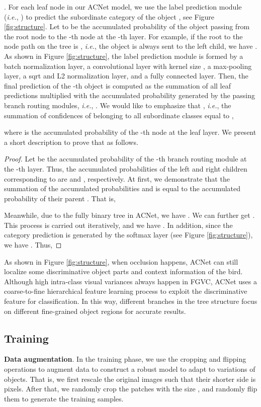 \documentclass[10pt,twocolumn,letterpaper]{article}
\def\ie{{\em i.e.}}
\begin{document}
{.} For each leaf node in our ACNet model, we use the label prediction module  (\ie, ) to predict the subordinate category of the object , see Figure \ref{fig:structure}. Let  to be the accumulated probability of the object  passing from the root node to the -th node at the -th layer. For example, if the root to the node  path on the tree is , \ie, the object  is always sent to the left child, we have . As shown in Figure \ref{fig:structure}, the label prediction module is formed by a batch normalization layer, a convolutional layer with kernel size , a max-pooling layer, a sqrt and L2 normalization layer, and a fully connected layer. Then, the final prediction   of the -th object  is computed as the summation of all leaf predictions multiplied with the accumulated probability generated by the passing branch routing modules, \ie, . We would like to emphasize that , \ie, the summation of confidences of  belonging to all subordinate classes equal to ,

where  is the accumulated probability of the -th node at the leaf layer. We present a short description to prove that  as follows.
\begin{proof}
Let  be the accumulated probability of the -th branch routing module  at the -th layer. Thus, the accumulated probabilities of the left and right children corresponding to  are  and , respectively. At first, we demonstrate that the summation of the accumulated probabilities  and  is equal to the accumulated probability of their parent . That is, 

Meanwhile, due to the fully binary tree  in ACNet, we have . We can further get . This process is carried out iteratively, and we have . In addition, since the category prediction  is generated by the softmax layer (see Figure \ref{fig:structure}), we have . Thus,  

\end{proof}
As shown in Figure \ref{fig:structure}, when occlusion happens, ACNet can still localize some discriminative object parts and context information of the bird. Although high intra-class visual variances always happen in FGVC, ACNet uses a coarse-to-fine hierarchical feature learning process to exploit the discriminative feature for classification. In this way, different branches in the tree structure focus on different fine-grained object regions for accurate results.  

\subsection{Training}
{\flushleft \textbf{Data augmentation}.} In the training phase, we use the cropping and flipping operations to augment data to construct a robust model to adapt to variations of objects. That is, we first rescale the original images such that  their shorter side is  pixels. After that, we randomly crop the patches with the size , and randomly flip them to generate the training samples.
\end{document}
